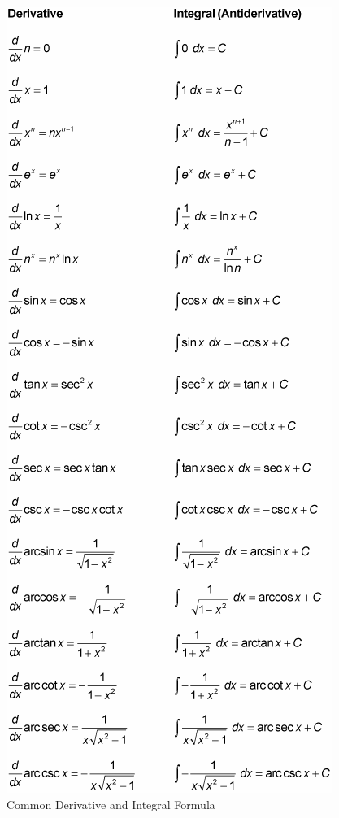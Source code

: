 \documentclass[12pt,twoside]{article}
\begin{document}
\begin{figure}[h!]    
\centering
    \includegraphics[scale=.7]{Pictures/diff and integration.png}
    \caption{Common Derivative and Integral Formula}
    \label{fig:my_label}
\end{figure}
\end{document}
